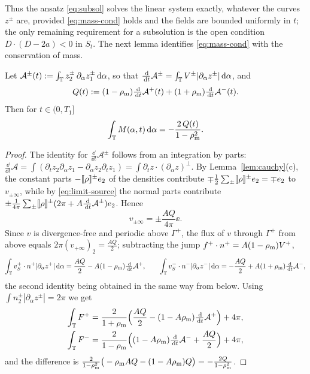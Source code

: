 Thus the ansatz \eqref{eq:subsol} solves the linear system exactly, whatever the curves $z^\pm$ are, provided \eqref{eq:mass-cond} holds and the fields are bounded uniformly in $t$; the only
remaining requirement for a subsolution is the open condition $D\cdot(D-2a)<0$ in $S_t$. The next lemma identifies \eqref{eq:mass-cond} with the conservation of mass.

\begin{lemma}\label{lem:mass}
Let $\mathcal A^\pm(t):=\int_{\mathbb{T}} z_2^\pm\,\partial_\alpha z_1^\pm\,\mathrm{d}\alpha$, so that $\frac{\,\mathrm{d}}{\,\mathrm{d} t}\mathcal A^\pm=\int_{\mathbb{T}} V^\pm|\partial_\alpha z^\pm|\,\mathrm{d}\alpha$, and
\[
Q(t):=(1-\rho_{\mathrm m})\tfrac{\,\mathrm{d}}{\,\mathrm{d} t}\mathcal A^+(t)+(1+\rho_{\mathrm m})\tfrac{\,\mathrm{d}}{\,\mathrm{d} t}\mathcal A^-(t).
\]
Then for $t\in(0,T_1]$
\[
\int_{\mathbb{T}} M(\alpha,t)\,\mathrm{d}\alpha=-\frac{2\,Q(t)}{1-\rho_{\mathrm m}^2}.
\]
\end{lemma}

\begin{proof}
The identity for $\frac{\dd}{\dd t}\mathcal A^\pm$ follows from an integration by parts: $\frac{\dd}{\dd t}\mathcal A=\int(\partial_tz_2\partial_\alpha z_1-\partial_\alpha z_2\partial_tz_1)=\int\partial_tz\cdot(\partial_\alpha z)^\perp$.
By Lemma~\ref{lem:cauchy}(c), the constant parts $-[\![\rho]\!]^\pm e_2$ of the densities contribute $\mp\frac12\sum_\pm[\![\rho]\!]^\pm e_2=\mp e_2$ to $v_{\pm\infty}$, while by \eqref{eq:limit-source} the normal parts
contribute $\pm\frac1{4\pi}\sum_\pm[\![\rho]\!]^\pm(2\pi+A\frac{\,\mathrm{d}}{\,\mathrm{d} t}\mathcal A^\pm)e_2$. Hence
\[
v_{\pm\infty}=\pm\frac{AQ}{4\pi}\ee .
\]
Since $v$ is divergence-free and periodic above $\Gamma^+$, the flux of $v$ through $\Gamma^+$ from above equals $2\pi(v_{+\infty})_2=\frac{AQ}2$; subtracting the jump $f^+\cdot n^+=A(1-\rho_{\mathrm m})V^+$,
\[
\int_{\mathbb{T}} v_S^+\cdot n^+|\partial_\alpha z^+|\,\mathrm{d}\alpha=\frac{AQ}{2}-A(1-\rho_{\mathrm m})\tfrac{\,\mathrm{d}}{\,\mathrm{d} t}\mathcal A^+,\qquad
\int_{\mathbb{T}} v_S^-\cdot n^-|\partial_\alpha z^-|\,\mathrm{d}\alpha=-\frac{AQ}{2}+A(1+\rho_{\mathrm m})\tfrac{\,\mathrm{d}}{\,\mathrm{d} t}\mathcal A^-,
\]
the second identity being obtained in the same way from below. Using $\int n_2^\pm|\partial_\alpha z^\pm|=2\pi$ we get
\begin{align*}
\int_{\mathbb{T}} F^+&=\frac{2}{1+\rho_{\mathrm m}}\Big(\frac{AQ}{2}-(1-A\rho_{\mathrm m})\tfrac{\,\mathrm{d}}{\,\mathrm{d} t}\mathcal A^+\Big)+4\pi,\\
\int_{\mathbb{T}} F^-&=\frac{2}{1-\rho_{\mathrm m}}\Big((1-A\rho_{\mathrm m})\tfrac{\,\mathrm{d}}{\,\mathrm{d} t}\mathcal A^-+\frac{AQ}2\Big)+4\pi,
\end{align*}
and the difference is $\frac{2}{1-\rho_{\mathrm m}^2}\big(-\rho_{\mathrm m} AQ-(1-A\rho_{\mathrm m})Q\big)=-\frac{2Q}{1-\rho_{\mathrm m}^2}$.
\end{proof}

